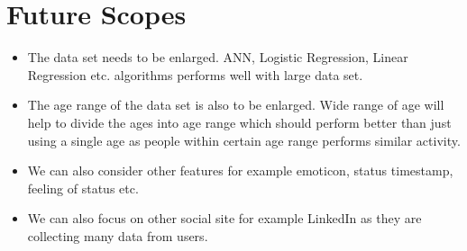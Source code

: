 \documentclass{standalone}
\begin{document}
\section{Future Scopes}
\begin{itemize}
	\item The data set needs to be enlarged. ANN, Logistic Regression, Linear Regression etc. algorithms performs well with large data set. 
	\item The age range of the data set is also to be enlarged. Wide range of age will help to divide the ages into age range which should perform better than just using a single age as people within certain age range performs similar activity.
	
	\item We can also consider other features for example emoticon, status timestamp, feeling of status etc.
	\item We can also focus on other social site for example LinkedIn as they are collecting many data from users.
\end{itemize}
\end{document}
